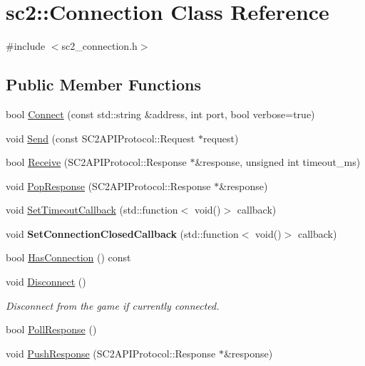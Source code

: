 \hypertarget{classsc2_1_1_connection}{}\section{sc2\+:\+:Connection Class Reference}
\label{classsc2_1_1_connection}


{\ttfamily \#include $<$sc2\+\_\+connection.\+h$>$}

\subsection*{Public Member Functions}
\begin{DoxyCompactItemize}
\item 
bool \hyperlink{classsc2_1_1_connection_ae2b9a0a28789ac5c6304506cf0bea4b0}{Connect} (const std\+::string \&address, int port, bool verbose=true)
\item 
void \hyperlink{classsc2_1_1_connection_af6bd305434d9efd78a6868749e764749}{Send} (const S\+C2\+A\+P\+I\+Protocol\+::\+Request $\ast$request)
\item 
bool \hyperlink{classsc2_1_1_connection_a383d7968897ccc2e35c2716bb110584f}{Receive} (S\+C2\+A\+P\+I\+Protocol\+::\+Response $\ast$\&response, unsigned int timeout\+\_\+ms)
\item 
void \hyperlink{classsc2_1_1_connection_af2d5cf1aff2fef4d30ddd9ab256419ed}{Pop\+Response} (S\+C2\+A\+P\+I\+Protocol\+::\+Response $\ast$\&response)
\item 
void \hyperlink{classsc2_1_1_connection_a1a3d3c532703e0bf7a88f49ee22aa65e}{Set\+Timeout\+Callback} (std\+::function$<$ void()$>$ callback)
\item 
\mbox{\label{classsc2_1_1_connection_a1f2556582badc5f98b349efa17d823cd}} 
void {\bfseries Set\+Connection\+Closed\+Callback} (std\+::function$<$ void()$>$ callback)
\item 
bool \hyperlink{classsc2_1_1_connection_a69ca71e72ab2a0a1bad36fc729fedc02}{Has\+Connection} () const
\item 
\mbox{\label{classsc2_1_1_connection_a0a84c7b58a8ecb0046f6ad235ce01067}} 
void \hyperlink{classsc2_1_1_connection_a0a84c7b58a8ecb0046f6ad235ce01067}{Disconnect} ()
\begin{DoxyCompactList}\small\item\em Disconnect from the game if currently connected. \end{DoxyCompactList}\item 
bool \hyperlink{classsc2_1_1_connection_a7c06854ac5724952f69fb229a3defcee}{Poll\+Response} ()
\item 
void \hyperlink{classsc2_1_1_connection_aad919078849b1b85b38db8d8d11c8004}{Push\+Response} (S\+C2\+A\+P\+I\+Protocol\+::\+Response $\ast$\&response)
\end{DoxyCompactItemize}
